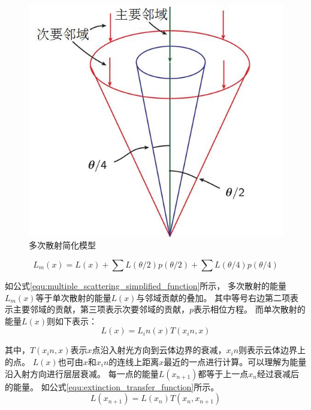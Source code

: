 \begin{figure}
\centering
\includegraphics{figure/multiple_scattering_simplified_model.jpg}
\caption{多次散射简化模型}
\label{fig:multiple_scattering_simplified_model}
\end{figure}

\begin{equation}
\label{equ:multiple_scattering_simplified_function}
L_m(x)=L(x) + \sum{}L(\theta{}/2)p(\theta{}/2) + \sum{}L(\theta{}/4)p(\theta{}/4)
\end{equation}

如公式\ref{equ:multiple_scattering_simplified_function}所示，
多次散射的能量$L_m(x)$等于单次散射的能量$L(x)$与邻域贡献的叠加。
其中等号右边第二项表示主要邻域的贡献，第三项表示次要邻域的贡献，$p$表示相位方程。
而单次散射的能量$L(x)$则如下表示：
\begin{equation}
\label{equ:illumination}
L(x)=L_in(x)T(x_in,x)
\end{equation}

其中，$T(x_in,x)$表示$x$点沿入射光方向到云体边界的衰减，$x_in$则表示云体边界上的点。
$L(x)$也可由$x$和$x_in$的连线上距离$x$最近的一点进行计算。可以理解为能量沿入射方向进行层层衰减。
每一点的能量$L(x_{n+1})$都等于上一点$x_n$经过衰减后的能量。
如公式\ref{equ:extinction_transfer_function}所示。
\begin{equation}
\label{equ:extinction_transfer_function}
L(x_{n+1})=L(x_n)T(x_n,x_{n+1})
\end{equation}


